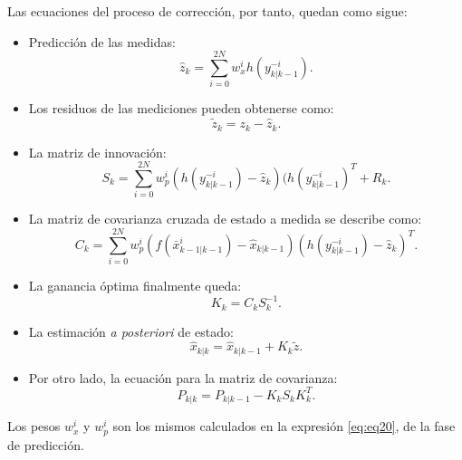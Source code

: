 \begin{enumerate}
Las ecuaciones del proceso de correcci\'on, por tanto, quedan como sigue:
\begin{itemize}
\item Predicci\'on de las medidas:\\
\begin{equation}
\label{eq:eq25}
\hat{z}_{k} = \sum_{i=0}^{2N} w_x^i h(y_{k|k-1}^{-i}).
\end{equation}
\item Los residuos de las mediciones pueden obtenerse como:\\
\begin{equation}
\tilde{z}_k = z_k - \hat{z}_k.
\label{eq:eq26}
\end{equation}
\item La matriz de innovaci\'on:\\
\begin{equation}
S_k = \sum_{i=0}^{2N} w_p^i (h(y_{k|k-1}^{-i}) - \hat{z}_k)(h(y_{k|k-1}^{-i})^T + R_k.
\label{eq:eq27}
\end{equation}
\item La matriz de covarianza cruzada de estado a medida se describe como:\\
\begin{equation}
C_k = \sum_{i=0}^{2N} w_p^i ( f(\bar{x}^i_{k-1 | k-1})- \hat{x}_{k|k-1} )( h(y_{k|k-1}^{-i}) - \hat{z}_k )^T.
\label{eq:eq28}
\end{equation}
\item La ganancia \'optima finalmente queda:\\
\begin{equation}
K_k = C_kS_k^{-1}.
\label{eq:eq29}
\end{equation}
\item La estimaci\'on \textit{a posteriori} de estado:\\
\begin{equation}
\label{eq:eq30}
 \hat{x}_{k|k} =  \hat{x}_{k|k-1} + K_k \tilde{z}.
\end{equation}
\item Por otro lado, la ecuaci\'on para la matriz de covarianza:\\
\begin{equation}
\label{eq:eq31}
P_{k|k} = P_{k|k-1} - K_kS_kK_k^T.
\end{equation}
\end{itemize}
Los pesos $w_x^i$ y $w_p^i$ son los mismos calculados en la expresi\'on \ref{eq:eq20}, de la fase de predicci\'on.
\end{enumerate}
\bigskip

